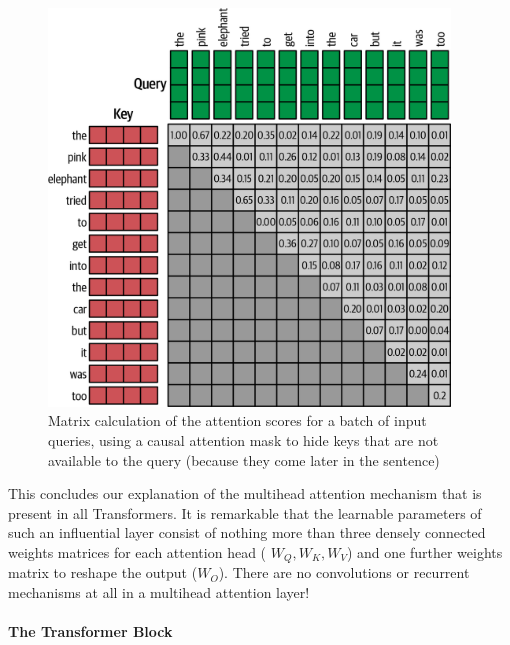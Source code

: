\begin{figure}
    \begin{center}
        \includegraphics[width=0.95\textwidth]{figures/causal_mask}
    \end{center}
    \caption{Matrix calculation of the attention scores for a batch of input queries, using a causal attention mask to hide keys that are not available to the query (because they come later in the sentence)}\label{fig:causal_mask}
\end{figure}


This concludes our explanation of the multihead attention mechanism that is present in all Transformers.
It is remarkable that the learnable parameters of such an influential layer consist of nothing more than three densely connected weights matrices for each attention head ( \( W_Q, W_K, W_V \)) and one further weights matrix to reshape the output (\( W_O \)).
There are no convolutions or recurrent mechanisms at all in a multihead attention layer!

\paragraph{The Transformer Block~\cite{fig:transformer_block}}

